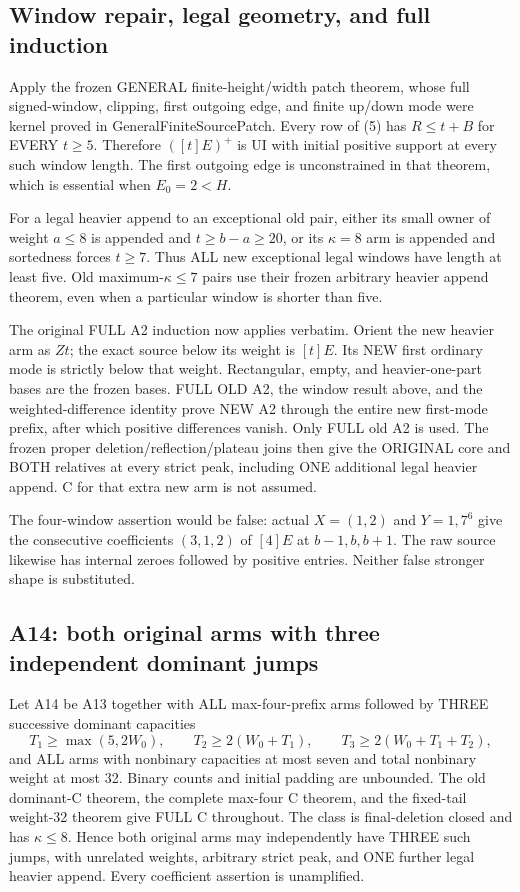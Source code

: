\subsection{Window repair, legal geometry, and full induction}
Apply the frozen GENERAL finite-height/width patch theorem, whose
full signed-window, clipping, first outgoing edge, and finite up/down
mode were kernel proved in GeneralFiniteSourcePatch. Every row of
(5) has $R\le t+B$ for EVERY $t\ge5$. Therefore $([t]E)^+$ is
UI with initial positive support at every such window length.
The first outgoing edge is unconstrained in that theorem, which
is essential when $E_0=2<H$.

For a legal heavier append to an exceptional old pair, either its
small owner of weight $a\le8$ is appended and $t\ge b-a\ge20$,
or its $\kappa=8$ arm is appended and sortedness forces $t\ge7$.
Thus ALL new exceptional legal windows have length at least five.
Old maximum-$\kappa\le7$ pairs use their frozen arbitrary heavier
append theorem, even when a particular window is shorter than five.

The original FULL A2 induction now applies verbatim. Orient the new
heavier arm as $Zt$; the exact source below its weight is $[t]E$.
Its NEW first ordinary mode is strictly below that weight. Rectangular,
empty, and heavier-one-part bases are the frozen bases. FULL OLD A2,
the window result above, and the weighted-difference identity prove
NEW A2 through the entire new first-mode prefix, after which positive
differences vanish. Only FULL old A2 is used. The frozen proper
deletion/reflection/plateau joins then give the ORIGINAL core and
BOTH relatives at every strict peak, including ONE additional legal
heavier append. C for that extra new arm is not assumed.

The four-window assertion would be false: actual $X=(1,2)$ and
$Y=1,7^6$ give the consecutive coefficients $(3,1,2)$ of $[4]E$
at $b-1,b,b+1$. The raw source likewise has internal zeroes followed
by positive entries. Neither false stronger shape is substituted.

\subsection{A14: both original arms with three independent dominant jumps}
Let A14 be A13 together with ALL max-four-prefix arms followed by
THREE successive dominant capacities
\[
 T_1\ge\max(5,2W_0),\qquad
 T_2\ge2(W_0+T_1),\qquad T_3\ge2(W_0+T_1+T_2),
\]
and ALL arms with nonbinary capacities at most seven and total
nonbinary weight at most 32. Binary counts and initial padding are
unbounded. The old dominant-C theorem, the complete max-four C
theorem, and the fixed-tail weight-32 theorem give FULL C throughout.
The class is final-deletion closed and has $\kappa\le8$.
Hence both original arms may independently have THREE such jumps,
with unrelated weights, arbitrary strict peak, and ONE further legal
heavier append. Every coefficient assertion is unamplified.

